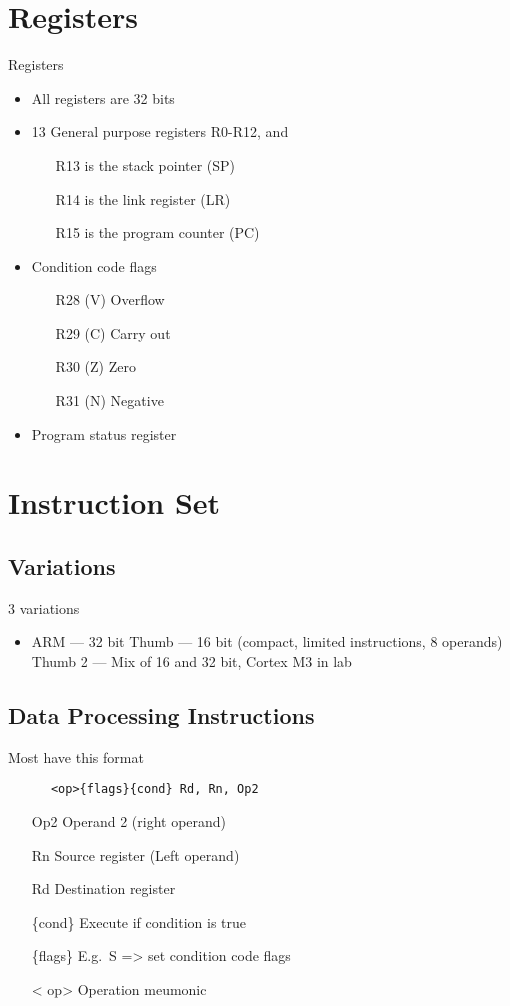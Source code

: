   \section{Registers}
    Registers\:
    \begin{itemize}
      \item All registers are 32 bits
      \item 13 General purpose registers\: R0-R12, and
        \begin{itemize}
          \item[R13] is the stack pointer (SP)
          \item[R14] is the link register (LR)
          \item[R15] is the program counter (PC)
        \end{itemize}
      \item Condition code flags\:
        \begin{itemize}
        \item[R28 (V)] Overflow
        \item[R29 (C)] Carry out
        \item[R30 (Z)] Zero
        \item[R31 (N)] Negative
        \end{itemize}
      \item Program status register
    \end{itemize}

  \section{Instruction Set}
    \subsection{Variations}
    3 variations
    \begin{itemize}
      \item ARM --- 32 bit
        Thumb --- 16 bit (compact, limited instructions, 8 operands)
        Thumb 2 --- Mix of 16 and 32 bit, Cortex M3 in lab
    \end{itemize}

    \subsection{Data Processing Instructions}
    Most have this format\\
    \begin{lstlisting}
      <op>{flags}{cond} Rd, Rn, Op2
    \end{lstlisting}
    \begin{itemize}
      \item[Op2] Operand 2 (right operand)
      \item[Rn] Source register (Left operand)
      \item[Rd] Destination register
      \item[\{cond\}] Execute if condition is true
      \item[\{flags\}] E.g.\ S =\textgreater{} set condition code flags
      \item[\textless{} op\textgreater] Operation meumonic
    \end{itemize}
